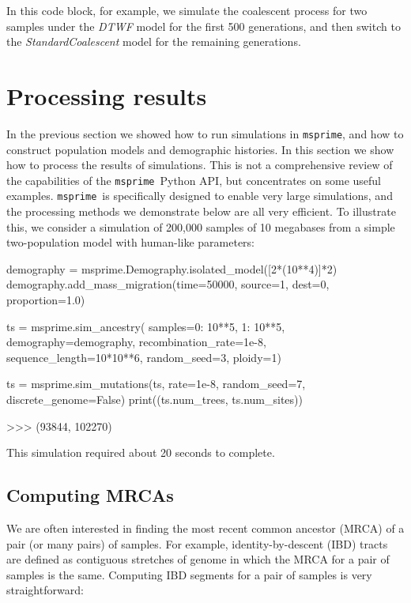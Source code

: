 \documentclass[graybox]{svmult}
\newcommand{\msprime}[0]{\texttt{msprime}}
\begin{document}
In this code block, for example, we simulate the coalescent process for two samples under the \emph{DTWF} model for the first 500 generations,
and then switch to the \emph{StandardCoalescent} model for the remaining generations.


\section{Processing results}\label{processing-results}

In the previous section we showed how to run simulations in \msprime, and
how to construct population models and demographic histories. In this
section we show how to process the results of simulations. This is not a
comprehensive review of the capabilities of the \msprime\ Python API, but
concentrates on some useful examples.
\msprime\ is specifically designed to enable very large simulations, and
the processing methods we demonstrate below are all very efficient. To
illustrate this, we consider a simulation of 200,000 samples of 10 megabases
from a simple two-population model with human-like parameters:

\begin{pythoncode}
demography = msprime.Demography.isolated_model([2*(10**4)]*2)
demography.add_mass_migration(time=50000, source=1, dest=0, proportion=1.0)

ts = msprime.sim_ancestry(
    samples={0: 10**5, 1: 10**5},
    demography=demography, recombination_rate=1e-8,
    sequence_length=10*10**6, random_seed=3,
    ploidy=1)

ts = msprime.sim_mutations(ts, rate=1e-8, random_seed=7, discrete_genome=False)
print((ts.num_trees, ts.num_sites))

>>> (93844, 102270)
\end{pythoncode}

This simulation required about 20 seconds to complete.


\subsection{Computing MRCAs}\label{computing-mrcas}

We are often interested in finding the most recent common ancestor (MRCA)
of a pair (or many pairs) of samples. For example, identity-by-descent
(IBD) tracts are defined as contiguous stretches of genome in which the
MRCA for a pair of samples is the same. Computing IBD segments for a
pair of samples is very straightforward:
\end{document}
